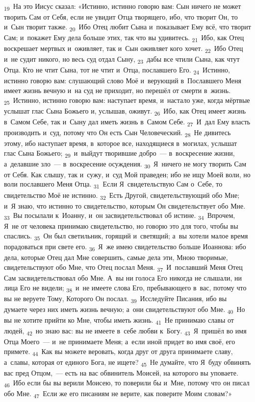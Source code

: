 \documentclass[a4paper,12pt]{article}
\begin{document}
\textsubscript{19}~На это Иисус сказал: «Истинно, истинно говорю вам: Сын ничего не может творить Сам от Себя, если не увидит Отца творящего, ибо, что творит Он, то и~Сын творит также.
\textsubscript{20}~Ибо Отец любит Сына и~показывает Ему всё, что творит Сам; и~покажет Ему дела больше этих, так что вы удивитесь.
\textsubscript{21}~Ибо, как Отец воскрешает мертвых и~оживляет, так и~Сын оживляет кого хочет.
\textsubscript{22}~Ибо Отец и~не судит никого, но весь суд отдал Сыну,
\textsubscript{23}~дабы все чтили Сына, как чтут Отца. Кто не чтит Сына, тот не чтит и~Отца, пославшего Его.
\textsubscript{24}~Истинно, истинно говорю вам: слушающий слово Моё и~верующий в~Пославшего Меня имеет жизнь вечную и~на суд не приходит, но перешёл от смерти в~жизнь.
\textsubscript{25}~Истинно, истинно говорю вам: наступает время, и~настало уже, когда мёртвые услышат глас Сына Божьего и, услышав, оживут.
\textsubscript{26}~Ибо, как Отец имеет жизнь в~Самом Себе, так и~Сыну дал иметь жизнь в~Самом Себе.
\textsubscript{27}~И~дал Ему власть производить и~суд, потому что Он есть Сын Человеческий.
\textsubscript{28}~Не дивитесь этому, ибо наступает время, в~которое все, находящиеся в~могилах, услышат глас Сына Божьего;
\textsubscript{29}~и~выйдут творившие добро~--- в~воскресение жизни, а~делавшие зло~--- в~воскресение осуждения.
\textsubscript{30}~Я~ничего не могу творить Сам от Себя. Как слышу, так и~сужу, и~суд Мой праведен; ибо не ищу Моей воли, но воли пославшего Меня Отца.
\textsubscript{31}~Если Я~свидетельствую Сам о~Себе, то свидетельство Моё не истинно.
\textsubscript{32}~Есть Другой, свидетельствующий обо Мне; и~Я знаю, что истинно то свидетельство, которым Он свидетельствует обо Мне.
\textsubscript{33}~Вы посылали к~Иоанну, и~он засвидетельствовал об истине.
\textsubscript{34}~Впрочем, Я~не от человека принимаю свидетельство, но говорю это для того, чтобы вы спаслись.
\textsubscript{35}~Он был светильник, горящий и~светящий; а~вы хотели малое время порадоваться при свете его.
\textsubscript{36}~Я~же имею свидетельство больше Иоаннова: ибо дела, которые Отец дал Мне совершить, самые дела эти, Мною творимые, свидетельствуют обо Мне, что Отец послал Меня.
\textsubscript{37}~И~пославший Меня Отец Сам засвидетельствовал обо Мне. А~вы ни голоса Его никогда не слышали, ни лица Его не видели;
\textsubscript{38}~и~не имеете слова Его, пребывающего в~вас, потому что вы не веруете Тому, Которого Он послал.
\textsubscript{39}~Исследуйте Писания, ибо вы думаете через них иметь жизнь вечную; а~они свидетельствуют обо Мне.
\textsubscript{40}~Но вы не хотите прийти ко Мне, чтобы иметь жизнь.
\textsubscript{41}~Не принимаю славы от людей,
\textsubscript{42}~но знаю вас: вы не имеете в~себе любви к~Богу.
\textsubscript{43}~Я~пришёл во имя Отца Моего~--- и~не принимаете Меня; а~если иной придет во имя своё, его примете.
\textsubscript{44}~Как вы можете веровать, когда друг от друга принимаете славу, а~славы, которая от единого Бога, не ищете?
\textsubscript{45}~Не думайте, что Я~буду обвинять вас пред Отцом,~--- есть на вас обвинитель Моисей, на которого вы уповаете.
\textsubscript{46}~Ибо если бы вы верили Моисею, то поверили бы и~Мне, потому что он писал обо Мне.
\textsubscript{47}~Если же его писаниям не верите, как поверите Моим словам?» 
\end{document}
